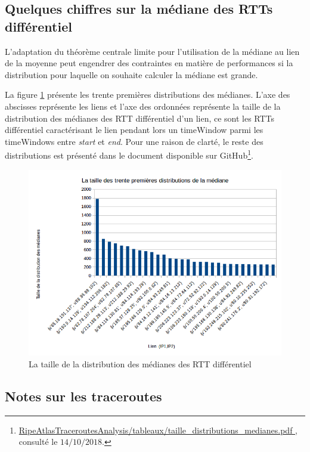 \subsection{Quelques chiffres  sur la médiane des RTTs différentiel}

L'adaptation du théorème centrale limite pour l'utilisation de la médiane au lien de la moyenne peut engendrer des contraintes en matière de performances si la distribution pour laquelle on souhaite calculer la médiane est grande. 

La figure \ref{fig:size_dist_med} présente les trente premières distributions des médianes. L'axe des abscisses représente les liens et l'axe des ordonnées représente la taille de la distribution des médianes des RTT différentiel d'un lien, ce sont les RTTs différentiel caractérisant le lien pendant lors un timeWindow parmi les timeWindows entre \textit{start} et \textit{end}.   Pour une  raison de clarté,  le reste des distributions est présenté dans le document disponible sur GitHub\footnote{\url{ RipeAtlasTraceroutesAnalysis/tableaux/taille_distributions_medianes.pdf }, consulté le $14/10/2018$.}. 


\begin{figure}[H]
\centering
\includegraphics[width=1\linewidth]{illustrations/size_dist_med}
\caption{ La taille de la distribution des médianes des RTT différentiel }
\label{fig:size_dist_med}
\end{figure}


\subsection{Notes sur les traceroutes }

